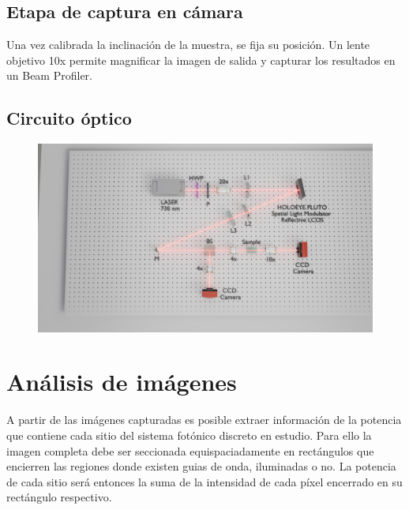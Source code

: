 \subsection{Etapa de captura en cámara}
Una vez calibrada la inclinación de la muestra, se fija su posición. Un lente objetivo 10x permite magnificar la imagen de salida y capturar los resultados en un Beam Profiler.
\subsection{Circuito óptico}
\begin{figure}[H]
	\centering
	\includegraphics[width=\linewidth, trim={21cm 5cm 7cm 5cm},clip]{media/SLM_setupv1}
\end{figure}

\section{Análisis de imágenes \label{sec:analimag}}
A partir de las imágenes capturadas es posible extraer información de la potencia que contiene cada sitio del sistema fotónico discreto en estudio. Para ello la imagen completa debe ser seccionada equispaciadamente en rectángulos que encierren las regiones donde existen guias de onda, iluminadas o no. La potencia de cada sitio será entonces la suma de la intensidad de cada píxel encerrado en su rectángulo respectivo.

